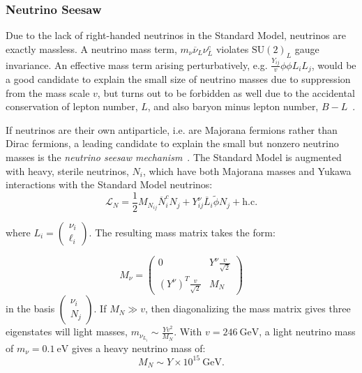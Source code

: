 \subsubsection{Neutrino Seesaw}\label{sec:theory-bsm-seesaw}
Due to the lack of right-handed neutrinos in the Standard Model, neutrinos are exactly massless. A neutrino mass term, $m_{\nu} \overline{\nu}_L \nu_L^c$ violates $\mathrm{SU}(2)_L$ gauge invariance. An effective mass term arising perturbatively, e.g. $\frac{Y_{ij}}{v}\phi\phi L_i L_j$, would be a good candidate to explain the small size of neutrino masses due to suppression from the mass scale $v$, but turns out to be forbidden as well due to the accidental conservation of lepton number, $L$, and also baryon minus lepton number, $B-L$~\cite{RevModPhys.75.345}. 

If neutrinos are their own antiparticle, i.e. are Majorana fermions rather than Dirac fermions, a leading candidate to explain the small but nonzero neutrino masses is the \emph{neutrino seesaw mechanism}~\cite{Mohapatra:1980yp,GellMann:1980vs,Yanagida:1980xy}. The Standard Model is augmented with heavy, sterile neutrinos, $N_i$, which have both Majorana masses and Yukawa interactions with the Standard Model neutrinos:
\begin{equation}
	\mathcal{L}_N = \frac12 M_{N_{ij}} \overline{N}^c_i N_j + Y_{ij}^{\nu} \overline{L}_{i} \tilde{\phi} N_{j} + \mathrm{h.c.}
\end{equation}

where $L_i = \left(\begin{array}{c}\nu_i \\ \ell_i \end{array}\right)$. The resulting mass matrix takes the form:

\begin{equation}
	M_{\nu} = \left(\begin{array}{cc} 0 & Y^{\nu} \frac{v}{\sqrt{2}} \\ (Y^{\nu})^T \frac{v}{\sqrt{2}} & M_N \end{array}\right)
\end{equation}
in the basis $\left(\begin{array}{c} \nu_{i} \\ N_j \end{array} \right)$. If $M_N \gg v$, then diagonalizing the mass matrix gives three eigenstates will light masses, $m_{\nu_{L_i}} \sim  \frac{Yv^2}{M_N}$. With $v=246~\mbox{GeV}$, a light neutrino mass of $m_{\nu}=0.1~\mbox{eV}$ gives a heavy neutrino mass of:
\begin{equation}
	M_N \sim Y \times 10^{15}~\mbox{GeV}.
\end{equation}

